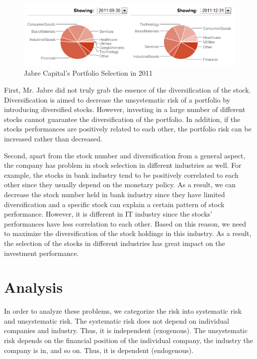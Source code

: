 \documentclass[oneside,12pt]{report}
\begin{document}
\begin{figure}[h]
    \begin{center}
        \includegraphics[width=\textwidth]{2.png}
    \end{center}
    \caption{Jabre Capital's Portfolio Selection in 2011}
    \label{fig:piechart}
\end{figure}

First, Mr. Jabre did not truly grab the essence of the diversification of the stock. Diversification is aimed to decrease the unsystematic risk of a portfolio by introducing diversified stocks. However, investing in a large number of different stocks cannot guarantee the diversification of the portfolio. In addition, if the stocks performances are positively related to each other, the portfolio risk can be increased rather than decreased.

Second, apart from the stock number and diversification from a general aspect, the company has problem in stock selection in different industries as well. For example, the stocks in bank industry tend to be positively correlated to each other since they usually depend on the monetary policy. As a result, we can decrease the stock number held in bank industry since they have limited diversification and a specific stock can explain a certain pattern of stock performance. However, it is different in IT industry since the stocks’ performances have less correlation to each other. Based on this reason, we need to maximize the diversification of the stock holdings in this industry. As a result, the selection of the stocks in different industries has great impact on the investment performance. 


\chapter{Analysis}\label{Analysis}
In order to analyze these problems, we categorize the risk into systematic risk and unsystematic risk. The systematic risk does not depend on individual companies and industry. Thus, it is independent (exogenous). The unsystematic risk depends on the financial position of the individual company, the industry the company is in, and so on. Thus, it is dependent (endogenous). 
\end{document}
